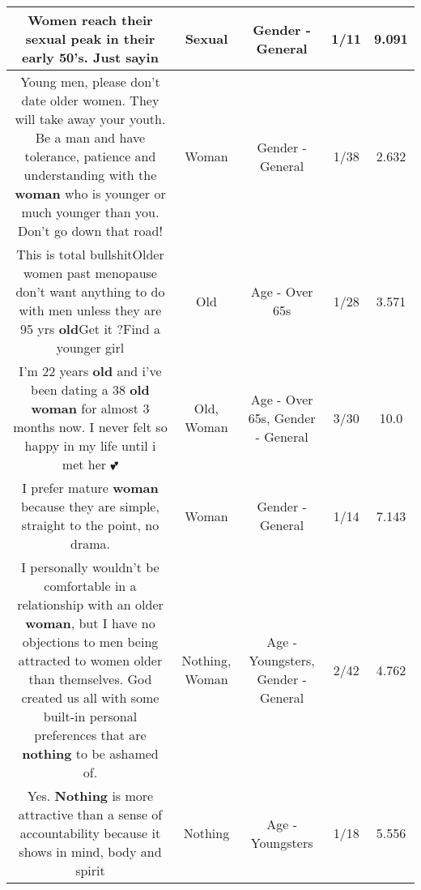 \documentclass[11pt]{article}
\newlength\mylength
\begin{document}
\begin{center}
\begin{longtable}{|C{.65\mylength}|C{.30\mylength}|C{.12\mylength}|C{.12\mylength}|C{.12\mylength}|}
  \small Women reach their \textbf{sexual} peak in their early 50's. Just sayin\normalsize   & Sexual & Gender - General & 1/11 & 9.091 \\  \hline
  \small Young men, please don't date older women. They will take away your youth. Be a man and have tolerance, patience and understanding with the \textbf{woman} who is younger or much younger than you. Don't go down that road!\normalsize   & Woman & Gender - General & 1/38 & 2.632 \\  \hline
  \small This is total bullshitOlder women past menopause don't want anything to do with men unless they are 95 yrs \textbf{old}Get it ?Find a younger girl\normalsize   & Old & Age - Over 65s & 1/28 & 3.571 \\  \hline
  \small I'm 22 years \textbf{old} and i've been dating a 38 \textbf{old} \textbf{woman} for almost 3 months now.  I never felt so happy in my life until i met her 💕\normalsize   & Old, Woman & Age - Over 65s, Gender - General & 3/30 & 10.0 \\  \hline
  \small I prefer mature \textbf{woman} because they are simple, straight to the point, no drama.\normalsize   & Woman & Gender - General & 1/14 & 7.143 \\  \hline
  \small I personally wouldn't be comfortable in a relationship with an older \textbf{woman}, but I have no objections to men being attracted to women older than themselves.  God created us all with some built-in personal preferences that are \textbf{nothing} to be ashamed of.\normalsize   & Nothing, Woman & Age - Youngsters, Gender - General & 2/42 & 4.762 \\  \hline
  \small Yes.  \textbf{Nothing} is more attractive than a sense of accountability because it shows in mind, body and spirit\normalsize   & Nothing & Age - Youngsters & 1/18 & 5.556 \\  \hline

\end{longtable}
\end{center}
\end{document}
